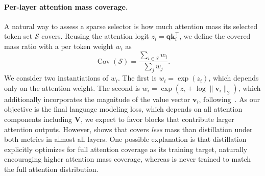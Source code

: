 \paragraph{Per-layer attention mass coverage.}
A natural way to assess a sparse selector is how much attention mass its selected token set $\mathcal{S}$ covers.
Reusing the attention logit $z_i=\mathbf{q}\mathbf{k}_i^\top$, we define the covered mass ratio with a per token weight $w_i$ as
\begin{equation}
    \operatorname{Cov}(\mathcal{S})
    =
    \frac{\sum_{i\in\mathcal{S}} w_i}{\sum_{j} w_j}.
    \label{eq:mass_coverage}
\end{equation}
We consider two instantiations of $w_i$. The first is $w_i=\exp(z_i)$, which depends only on the attention weight. The second is $w_i=\exp(z_i+\log\|\mathbf{v}_i\|_2)$, which additionally incorporates the magnitude of the value vector $\mathbf{v}_i$, following~\cite{niu2026stemrethinkingcausalinformation}.
As our objective is the final language modeling loss, which depends on all attention components including $\mathbf{V}$, we expect \our to favor blocks that contribute larger attention outputs.
However,  shows that \our covers \emph{less} mass than distillation under both metrics in almost all layers.
One possible explanation is that distillation explicitly optimizes for full attention coverage as its training target, naturally encouraging higher attention mass coverage, whereas \our is never trained to match the full attention distribution.

